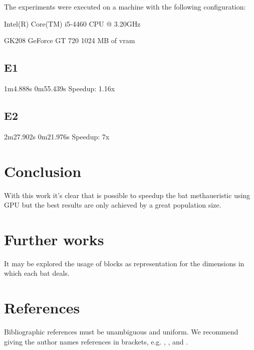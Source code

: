 \documentclass[12pt]{article}
\begin{document}
The experiments were executed on a machine with the following configuration:

Intel(R) Core(TM) i5-4460  CPU @ 3.20GHz

GK208 GeForce GT 720 1024 MB of vram
\subsection{E1}

1m4.888s
0m55.439s
Speedup: 1.16x


\subsection{E2}

2m27.902s
0m21.976s
Speedup: 7x

\section{Conclusion}

With this work it's clear that is possible to speedup the bat methaueristic using GPU but
the best results are only achieved by a great population size.

\section{Further works}

It may be explored the usage of blocks as representation for the dimensions in which each bat deals.


\section{References}

Bibliographic references must be unambiguous and uniform.  We recommend giving
the author names references in brackets, e.g. \cite{knuth:84},
\cite{boulic:91}, and \cite{smith:99}.




\end{document}
